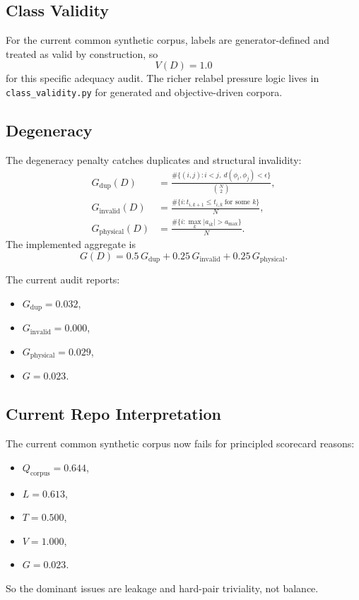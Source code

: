 \documentclass[11pt]{article}
\begin{document}
\subsection{Class Validity}

For the current common synthetic corpus, labels are generator-defined and
treated as valid by construction, so
\begin{equation}
    V(D)=1.0
\end{equation}
for this specific adequacy audit. The richer relabel pressure logic lives in
\texttt{class\_validity.py} for generated and objective-driven corpora.

\subsection{Degeneracy}

The degeneracy penalty catches duplicates and structural invalidity:
\begin{align}
    G_{\text{dup}}(D)
    &=
    \frac{
    \#\{(i,j): i<j,\ d(\phi_i,\phi_j)<\epsilon\}
    }{
    \binom{N}{2}
    }, \\
    G_{\text{invalid}}(D)
    &=
    \frac{\#\{i : t_{i,k+1}\le t_{i,k}\ \text{for some }k\}}{N}, \\
    G_{\text{physical}}(D)
    &=
    \frac{\#\{i : \max_k |a_{ik}| > a_{\max}\}}{N}.
\end{align}
The implemented aggregate is
\begin{equation}
    G(D)=0.5\,G_{\text{dup}}+0.25\,G_{\text{invalid}}+0.25\,G_{\text{physical}}.
\end{equation}

The current audit reports:
\begin{itemize}[leftmargin=1.5em]
    \item \(G_{\text{dup}} = 0.032\),
    \item \(G_{\text{invalid}} = 0.000\),
    \item \(G_{\text{physical}} = 0.029\),
    \item \(G = 0.023\).
\end{itemize}

\subsection{Current Repo Interpretation}

The current common synthetic corpus now fails for principled scorecard reasons:
\begin{itemize}[leftmargin=1.5em]
    \item \(Q_{\text{corpus}} = 0.644\),
    \item \(L = 0.613\),
    \item \(T = 0.500\),
    \item \(V = 1.000\),
    \item \(G = 0.023\).
\end{itemize}
So the dominant issues are leakage and hard-pair triviality, not balance.
\end{document}
